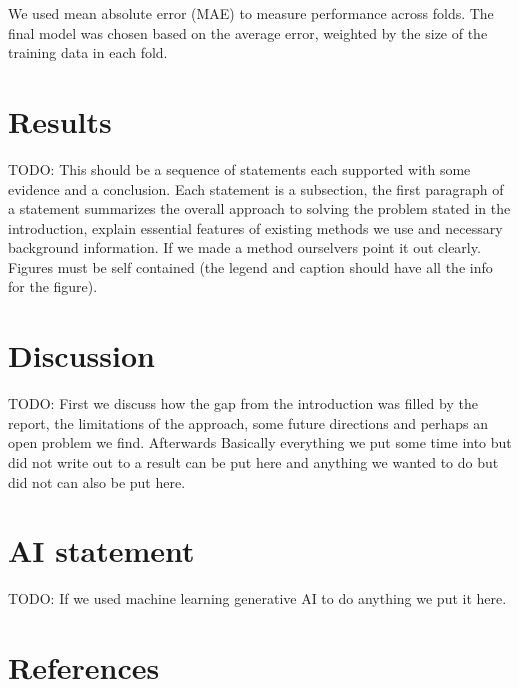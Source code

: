 \documentclass[conference]{IEEEtran}
\begin{document}
We used mean absolute error (MAE) to measure performance across folds. The final model was chosen based 
on the average error, weighted by the size of the training data in each fold.

\section{Results}
TODO: This should be a sequence of statements each supported with some evidence and a conclusion.
Each statement is a subsection, the first paragraph of a statement summarizes the overall approach 
to solving the problem stated in the introduction, explain essential features of existing methods
we use and necessary background information. If we made a method ourselvers point it out clearly. 
Figures must be self contained (the legend and caption should have all the info for the figure).

\section{Discussion}
TODO: First we discuss how the gap from the introduction was filled by the report, the limitations
of the approach, some future directions and perhaps an open problem we find. Afterwards Basically 
everything we put some time into but did not write out to a result can be put here and anything we 
wanted to do but did not can also be put here.

\section*{AI statement}
TODO: If we used machine learning generative AI to do anything we put it here.

\section*{References}
\end{document}

